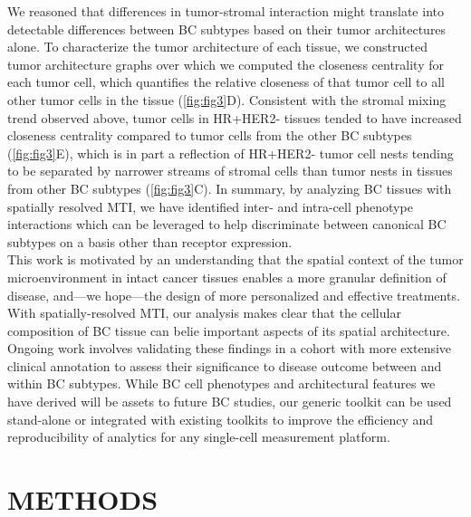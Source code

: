 \documentclass[preprint,review,3p,12pt]{elsarticle}
\begin{document}
We reasoned that differences in tumor-stromal interaction might translate into detectable differences between BC subtypes based on their tumor architectures alone. To characterize the tumor architecture of each tissue, we constructed tumor architecture graphs over which we computed the closeness centrality for each tumor cell, which quantifies the relative closeness of that tumor cell to all other tumor cells in the tissue (\autoref{fig:fig3}D). Consistent with the stromal mixing trend observed above, tumor cells in HR+HER2- tissues tended to have increased closeness centrality compared to tumor cells from the other BC subtypes (\autoref{fig:fig3}E), which is in part a reflection of HR+HER2- tumor cell nests tending to be separated by narrower streams of stromal cells than tumor nests in tissues from other BC subtypes (\autoref{fig:fig3}C). In summary, by analyzing BC tissues with spatially resolved MTI, we have identified inter- and intra-cell phenotype interactions which can be leveraged to help discriminate between canonical BC subtypes on a basis other than receptor expression. \\

This work is motivated by an understanding that the spatial context of the tumor microenvironment in intact cancer tissues enables a more granular definition of disease, and—we hope—the design of more personalized and effective treatments. With spatially-resolved MTI, our analysis makes clear that the cellular composition of BC tissue can belie important aspects of its spatial architecture. Ongoing work involves validating these findings in a cohort with more extensive clinical annotation to assess their significance to disease outcome between and within BC subtypes. While BC cell phenotypes and architectural features we have derived will be assets to future BC studies, our generic toolkit can be used stand-alone or integrated with existing toolkits \cite{histocat2017} to improve the efficiency and reproducibility of analytics for any single-cell measurement platform.

\section{METHODS}
\end{document}
